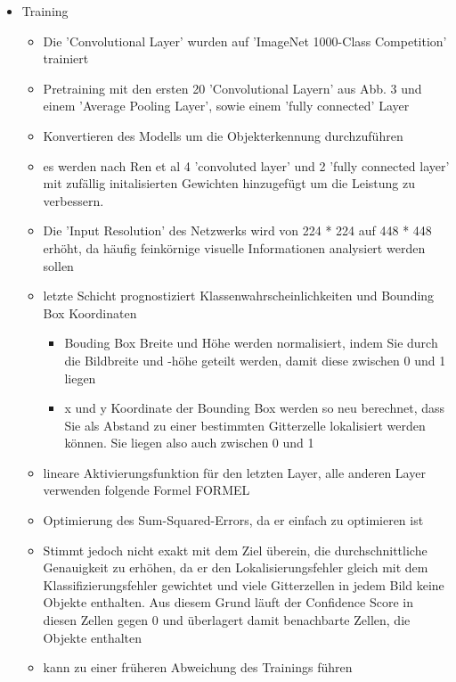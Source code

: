 {\begin{itemize}
\begin{itemize}
\begin{itemize}
				\item Die finale Ausgabe dieses Netzes ist ein 7 x 7 x 30 Tensor mit Vorhersagen
			\end{itemize}
			\item Training 
			\begin{itemize}
				\item Die 'Convolutional Layer' wurden auf 'ImageNet 1000-Class Competition' trainiert
				\item Pretraining mit den ersten 20 'Convolutional Layern' aus Abb. 3 und einem 'Average Pooling Layer', sowie einem 'fully connected' Layer
				\item Konvertieren des Modells um die Objekterkennung durchzuführen
				\item es werden nach Ren et al 4 'convoluted layer' und 2 'fully connected layer' mit zufällig initalisierten Gewichten hinzugefügt um die Leistung zu verbessern.  
				\item Die 'Input Resolution' des Netzwerks wird von 224 * 224 auf 448 * 448 erhöht, da häufig feinkörnige visuelle Informationen analysiert werden sollen
				\item letzte Schicht prognostiziert Klassenwahrscheinlichkeiten und Bounding Box Koordinaten
				\begin{itemize}
					\item Bouding Box Breite und Höhe werden normalisiert, indem Sie durch die Bildbreite und -höhe geteilt werden, damit diese zwischen 0 und 1 liegen
					\item x und y Koordinate der Bounding Box werden so neu berechnet, dass Sie als Abstand zu einer bestimmten Gitterzelle lokalisiert werden können. Sie liegen also auch zwischen 0 und 1 
				\end{itemize}
				\item lineare Aktivierungsfunktion für den letzten Layer, alle anderen Layer verwenden folgende Formel FORMEL
				\item Optimierung des Sum-Squared-Errors, da er einfach zu optimieren ist
				\item Stimmt jedoch nicht exakt mit dem Ziel überein, die durchschnittliche Genauigkeit zu erhöhen, da er den Lokalisierungsfehler gleich mit dem Klassifizierungsfehler gewichtet und viele Gitterzellen in jedem Bild keine Objekte enthalten. Aus diesem Grund läuft der Confidence Score in diesen Zellen gegen 0 und überlagert damit benachbarte Zellen, die Objekte enthalten
				\item kann zu einer früheren Abweichung des Trainings führen

\end{itemize}
\end{itemize}
\end{itemize}}
